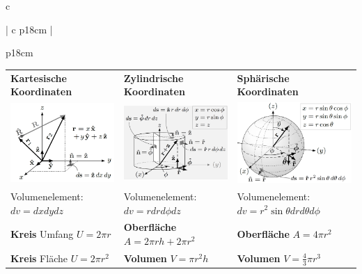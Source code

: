 \begin{tabular}{c}
\begin{tabular}{ | c   p{18cm} |}
\begin{tabular}{p{18cm}}
\begin{tabular}{L{5.6cm}| L{5.6cm}| L{5.8cm}}
			
			\textbf{Kartesische Koordinaten}& \textbf{Zylindrische Koordinaten} & \textbf{Sphärische Koordinaten}\\
			\includegraphics[width=5.6cm]{kartesische.png}& \includegraphics[width=5.6cm]{zylindrische.png}& \includegraphics[width=5.6cm]{spherische.png}\\
			Volumenelement: $ d v=d x d y d z$&Volumenelement: $d v = r d r d \phi d z$&Volumenelement: $d v=r^{2} \sin \theta d r d \theta d \phi$\\
			\textbf{Kreis} Umfang $U=2\pi r$&\textbf{Oberfläche} $A=2\pi rh+2\pi r^2$ & \textbf{Oberfläche} $A=4\pi r^2$ \\
			\textbf{Kreis} Fläche $U=2\pi r^2$&\textbf{Volumen} $V=\pi r^2h$ & \textbf{Volumen} $V=\frac{4}{3}\pi r^3$ \\
			
			
			

\end{tabular}
\end{tabular}
\end{tabular}
\end{tabular}
